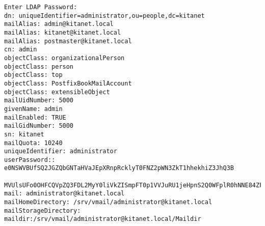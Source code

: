 \begin{lstlisting}[caption={Ergebnis der LDAP-Abfrage für den Nutzer 'administrator'}, label={ldapabfrage}]
Enter LDAP Password:
dn: uniqueIdentifier=administrator,ou=people,dc=kitanet
mailAlias: admin@kitanet.local
mailAlias: kitanet@kitanet.local
mailAlias: postmaster@kitanet.local
cn: admin
objectClass: organizationalPerson
objectClass: person
objectClass: top
objectClass: PostfixBookMailAccount
objectClass: extensibleObject
mailUidNumber: 5000
givenName: admin
mailEnabled: TRUE
mailGidNumber: 5000
sn: kitanet
mailQuota: 10240
uniqueIdentifier: administrator
userPassword:: e0NSWVBUfSQ2JGZQbGNTaHVaJEpXRnpRcklyT0FNZ2pWN3ZkT1hhekhiZ3JhQ3B
 MVUlsUFo0OHFCQVpZQ3FDL2MyY0liVkZISmpFT0p1VVJuRU1jeHpnS2Q0WFplR0hNNE84ZFdwREIv
mail: administrator@kitanet.local
mailHomeDirectory: /srv/vmail/administrator@kitanet.local
mailStorageDirectory: maildir:/srv/vmail/administrator@kitanet.local/Maildir
\end{lstlisting}

\newpage

